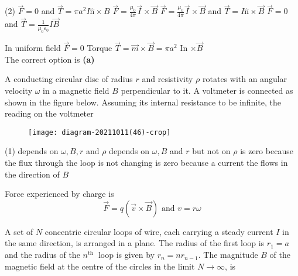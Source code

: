 \begin{enumerate}
\begin{minipage}{\textwidth}
\end{minipage}
\begin{tasks}(2)
	\task[\textbf{A.}] $\vec{F}=0$ and $\vec{T}=\pi a^{2} I \hat{\mathrm{n}} \times B$
	\task[\textbf{B.}]$\vec{F}=\frac{\mu_{0}}{4 \pi} \vec{I} \times \vec{B}$
	\task[\textbf{C.}]$\vec{F}=\frac{\mu_{0}}{4 \pi} \vec{I} \times \vec{B}$ and $\vec{T}=I \hat{\mathrm{n}} \times \vec{B}$
	\task[\textbf{D.}]$\vec{F}=0$ and $\vec{T}=\frac{1}{\mu_{0} \varepsilon_{0}} I \vec{B}$
\end{tasks}
\begin{answer}
	In uniform field $\vec{F}=0$
	Torque $\vec{T}=\vec{m} \times \vec{B}=\pi a^{2}$ In $\times \vec{B}$\\
	The correct option is \textbf{(a)}
\end{answer}
\begin{minipage}{\textwidth}
	\item A conducting circular disc of radius $r$ and resistivity $\rho$ rotates with an angular velocity $\omega$ in a magnetic field $B$ perpendicular to it. A voltmeter is connected as shown in the figure below. Assuming its internal resistance to be infinite, the reading on the voltmeter
	\begin{figure}[H]
		\centering
		\texttt{[image: diagram-20211011(46)-crop]}
	\end{figure}
\end{minipage}
\begin{tasks}(1)
	\task[\textbf{A.}] depends on $\omega, B, r$ and $\rho$
	\task[\textbf{B.}]depends on $\omega, B$ and $r$ but not on $\rho$
	\task[\textbf{C.}]is zero because the flux through the loop is not changing
	\task[\textbf{D.}]is zero because a current the flows in the direction of $B$
\end{tasks}
\begin{answer}
	Force experienced by charge is
	$$
	\vec{F}=q(\vec{v} \times \vec{B}) \text { and } v=r \omega
	$$	
\end{answer}
\begin{minipage}{\textwidth}
	\item A set of $N$ concentric circular loops of wire, each carrying a steady current $I$ in the same direction, is arranged in a plane. The radius of the first loop is $r_{1}=a$ and the radius of the $n^{\text {th }}$ loop is given by $r_{n}=n r_{n-1}$. The magnitude $B$ of the magnetic field at the centre of the circles in the limit $N \rightarrow \infty$, is
\end{minipage}

\end{enumerate}
